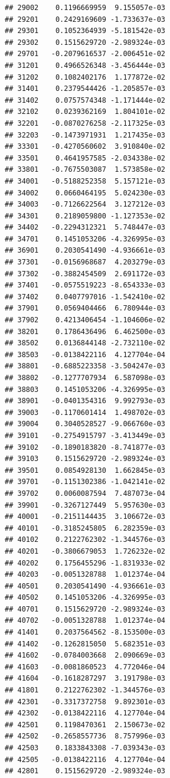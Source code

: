 \begin{frame}[fragile]
\begin{verbatim}
## 29002    0.1196669959  9.155057e-03
## 29201    0.2429169609 -1.733637e-03
## 29301    0.1052364939 -5.181542e-03
## 29302    0.1515629720 -2.989324e-03
## 29701   -0.2079616537 -2.006451e-02
## 31201    0.4966526348 -3.456444e-03
## 31202    0.1082402176  1.177872e-02
## 31401    0.2379544426 -1.205857e-03
## 31402    0.0757574348 -1.171444e-02
## 32102    0.0239362169  1.804101e-02
## 32201   -0.0870276258 -2.117325e-03
## 32203   -0.1473971931  1.217435e-03
## 33301   -0.4270560602  3.910840e-02
## 33501    0.4641957585 -2.034338e-02
## 33801   -0.7675503087  1.573858e-02
## 34001   -0.5188252358  5.157121e-03
## 34002    0.0660464195  5.024230e-03
## 34003   -0.7126622564  3.127212e-03
## 34301    0.2189059800 -1.127353e-02
## 34402   -0.2294312321  5.748447e-03
## 34701    0.1451053206 -4.326995e-03
## 36901    0.2030541490 -4.936661e-03
## 37301   -0.0156968687  4.203279e-03
## 37302   -0.3882454509  2.691172e-03
## 37401   -0.0575519223 -8.654333e-03
## 37402    0.0407797016 -1.542410e-02
## 37901    0.0569404466  6.780944e-03
## 37902    0.4213406454 -1.104606e-02
## 38201    0.1786436496  6.462500e-03
## 38502    0.0136844148 -2.732110e-02
## 38503   -0.0138422116  4.127704e-04
## 38801   -0.6885223358 -3.504247e-03
## 38802   -0.1277707934  6.587098e-03
## 38803    0.1451053206 -4.326995e-03
## 38901   -0.0401354316  9.992793e-03
## 39003   -0.1170601414  1.498702e-03
## 39004    0.3040528527 -9.066760e-03
## 39101   -0.2754915797 -3.413449e-03
## 39102   -0.1890183820 -8.741877e-03
## 39103    0.1515629720 -2.989324e-03
## 39501    0.0854928130  1.662845e-03
## 39701   -0.1151302386 -1.042141e-02
## 39702    0.0060087594  7.487073e-04
## 39901   -0.3267127449  5.957630e-03
## 40001   -0.2151144435  3.106672e-03
## 40101   -0.3185245805  6.282359e-03
## 40102    0.2122762302 -1.344576e-03
## 40201   -0.3806679053  1.726232e-02
## 40202    0.1756455296 -1.831933e-02
## 40203   -0.0051328788  1.012374e-04
## 40501    0.2030541490 -4.936661e-03
## 40502    0.1451053206 -4.326995e-03
## 40701    0.1515629720 -2.989324e-03
## 40702   -0.0051328788  1.012374e-04
## 41401    0.2037564562 -8.153500e-03
## 41402   -0.1262815050  5.682351e-03
## 41602   -0.0784003668  2.090669e-03
## 41603   -0.0081860523  4.772046e-04
## 41604   -0.1618287297  3.191798e-03
## 41801    0.2122762302 -1.344576e-03
## 42301   -0.3317372758  9.892301e-03
## 42302   -0.0138422116  4.127704e-04
## 42501    0.1198470361  2.150673e-02
## 42502   -0.2658557736  8.757996e-03
## 42503    0.1833843308 -7.039343e-03
## 42505   -0.0138422116  4.127704e-04
## 42801    0.1515629720 -2.989324e-03

\end{verbatim}
\end{frame}

